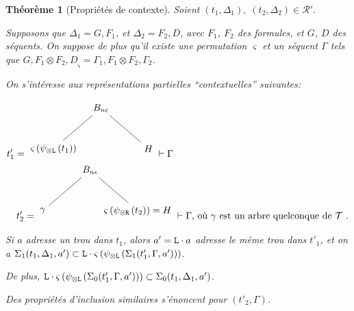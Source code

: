 \documentclass[11pt,a4paper]{article}
\theoremstyle{plain}
\newtheorem{theorem}{Théorème}
\theoremstyle{definition}
\theoremstyle{remark}
\newcommand*{\tensor}{\otimes}
\newcommand*{\someperm}{\varsigma}
\newcommand*{\sequent}{\Gamma}
\newcommand*{\sequentbis}{\Delta}
\newcommand*{\Left}{\textnormal{\texttt{L}}}
\newcommand*{\Right}{\textnormal{\texttt{R}}}
\newcommand*{\trees}{\ensuremath{\mathcal{T}}}
\newcommand*{\representationspartial}{\ensuremath{\mathcal{R'}}}
\newcommand*{\unknown}{H}
\newcommand*{\lowapprox}{\ensuremath{\Sigma_0}}
\newcommand*{\highapprox}{\ensuremath{\Sigma_1}}
\begin{document}
\begin{theorem}[Propriétés de contexte]
    \label{context_prop}
    Soient $(t_1, \sequentbis_1), \;  (t_2, \sequentbis_2) \in \representationspartial$. 
    
    Supposons que $\sequentbis_1 = G, F_1$, et $\sequentbis_2 = F_2, D$, avec $F_1$, $F_2$ des formules, et $G$, $D$ des séquents. On suppose de plus qu'il existe une permutation $\someperm$ et un séquent $\sequent$ tels que ${G, F_1 \tensor F_2, D}_\someperm = \sequent_1, F_1 \tensor F_2, \sequent_2$.

    On s'intéresse aux représentations partielles ``contextuelles'' suivantes:

    \begin{align*}
        \begin{multlined}
            t'_1 = \begin{tikzpicture}%
            [level 1/.style={sibling distance=3.5cm}]
            \node {$B_{n \epsilon}$}
                child {node {$\someperm \left( \psi_{\tensor\Left} \left(
                t_1\right) \right)$}}
                child {node {$\unknown$}
            };
            \end{tikzpicture}
            \vdash \sequent \\
            t'_2 = \begin{tikzpicture}%
            [level 1/.style={sibling distance=3.5cm}]
            \node {$B_{n \epsilon}$}
                child {node {$\gamma$}}
                child {node {$\someperm \left( \psi_{\tensor\Right} \left(t_2\right) \right) = \unknown$}
            };
            \end{tikzpicture}
            \vdash \sequent \text{, où $\gamma$ est un arbre quelconque de $\trees$ }.
        \end{multlined}
    \end{align*}
    
    Si $a$ adresse un trou dans $t_1$, alors $a' = \Left \cdot a$ adresse le même trou dans $t'_1$, et on a $\highapprox(t_1, \sequentbis_1, a') \subset \Left \cdot \someperm \left( \psi_{\tensor\Left} \left(\highapprox(t'_1, \sequent, a')\right) \right)$. 
    
    De plus, $\Left \cdot \someperm \left( \psi_{\tensor\Left} \left(\lowapprox(t'_1, \sequent, a')\right) \right) \subset \lowapprox(t_1, \sequentbis_1, a')$.
    
    Des propriétés d'inclusion similaires s'énoncent pour $(t'_2, \sequent)$.
\end{theorem}
\end{document}
